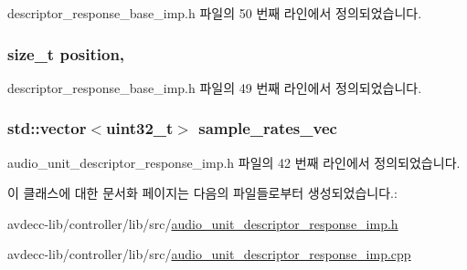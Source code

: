 descriptor\+\_\+response\+\_\+base\+\_\+imp.\+h 파일의 50 번째 라인에서 정의되었습니다.

\subsubsection[{\texorpdfstring{position}{position}}]{\setlength{\rightskip}{0pt plus 5cm}size\+\_\+t position\hspace{0.3cm}{\ttfamily [protected]}, {\ttfamily [inherited]}}\hypertarget{classavdecc__lib_1_1descriptor__response__base__imp_a7a04afe5347934be732ec70a70bd0a28}{}\label{classavdecc__lib_1_1descriptor__response__base__imp_a7a04afe5347934be732ec70a70bd0a28}


descriptor\+\_\+response\+\_\+base\+\_\+imp.\+h 파일의 49 번째 라인에서 정의되었습니다.

\subsubsection[{\texorpdfstring{sample\+\_\+rates\+\_\+vec}{sample_rates_vec}}]{\setlength{\rightskip}{0pt plus 5cm}std\+::vector$<${\bf uint32\+\_\+t}$>$ sample\+\_\+rates\+\_\+vec\hspace{0.3cm}{\ttfamily [private]}}\hypertarget{classavdecc__lib_1_1audio__unit__descriptor__response__imp_afacabe0a814fd76dd372964eee4a7f75}{}\label{classavdecc__lib_1_1audio__unit__descriptor__response__imp_afacabe0a814fd76dd372964eee4a7f75}


audio\+\_\+unit\+\_\+descriptor\+\_\+response\+\_\+imp.\+h 파일의 42 번째 라인에서 정의되었습니다.



이 클래스에 대한 문서화 페이지는 다음의 파일들로부터 생성되었습니다.\+:\begin{DoxyCompactItemize}
\item 
avdecc-\/lib/controller/lib/src/\hyperlink{audio__unit__descriptor__response__imp_8h}{audio\+\_\+unit\+\_\+descriptor\+\_\+response\+\_\+imp.\+h}\item 
avdecc-\/lib/controller/lib/src/\hyperlink{audio__unit__descriptor__response__imp_8cpp}{audio\+\_\+unit\+\_\+descriptor\+\_\+response\+\_\+imp.\+cpp}\end{DoxyCompactItemize}
